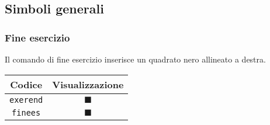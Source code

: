 \documentclass[11pt,a4paper,openany]{book}
\newcommand*{\cs}[1]{\texttt{\char92#1}}
\begin{document}
\subsection{Simboli generali}

\subsubsection{Fine esercizio}
Il comando di fine esercizio inserisce un quadrato nero allineato a destra.
\begin{center}
\begin{tabular}{cc}
\toprule
Codice & Visualizzazione\\
\midrule
\cs{exerend} & $\blacksquare$\\
\cs{finees} & $\blacksquare$\\
\bottomrule
\end{tabular}
\end{center}
\end{document}
